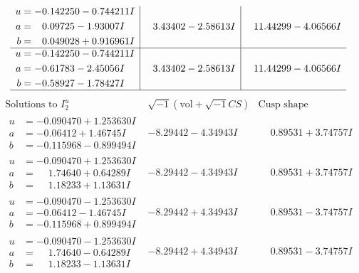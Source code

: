 \documentclass[1p]{elsarticle_modified}
\theoremstyle{definition}
\newcommand{\I}{\sqrt{-1}}
\begin{document}
$$\begin{array}{c|c|c}
\begin{aligned}
u &= -0.142250 - 0.744211 I \\
a &= \phantom{-}0.09725 - 1.93007 I \\
b &= \phantom{-}0.049028 + 0.916961 I\end{aligned}
 & \phantom{-}3.43402 - 2.58613 I & \phantom{-}11.44299 - 4.06566 I \\ \hline\begin{aligned}
u &= -0.142250 - 0.744211 I \\
a &= -0.61783 - 2.45056 I \\
b &= -0.58927 - 1.78427 I\end{aligned}
 & \phantom{-}3.43402 - 2.58613 I & \phantom{-}11.44299 - 4.06566 I\\
 \hline 
 \end{array}$$\newpage$$\begin{array}{c|c|c}  
\text{Solutions to }I^u_{2}& \I (\text{vol} + \sqrt{-1}CS) & \text{Cusp shape}\\
 \hline 
\begin{aligned}
u &= -0.090470 + 1.253630 I \\
a &= -0.06412 + 1.46745 I \\
b &= -0.115968 - 0.899494 I\end{aligned}
 & -8.29442 - 4.34943 I & \phantom{-}0.89531 + 3.74757 I \\ \hline\begin{aligned}
u &= -0.090470 + 1.253630 I \\
a &= \phantom{-}1.74640 + 0.64289 I \\
b &= \phantom{-}1.18233 + 1.13631 I\end{aligned}
 & -8.29442 - 4.34943 I & \phantom{-}0.89531 + 3.74757 I \\ \hline\begin{aligned}
u &= -0.090470 - 1.253630 I \\
a &= -0.06412 - 1.46745 I \\
b &= -0.115968 + 0.899494 I\end{aligned}
 & -8.29442 + 4.34943 I & \phantom{-}0.89531 - 3.74757 I \\ \hline\begin{aligned}
u &= -0.090470 - 1.253630 I \\
a &= \phantom{-}1.74640 - 0.64289 I \\
b &= \phantom{-}1.18233 - 1.13631 I\end{aligned}
 & -8.29442 + 4.34943 I & \phantom{-}0.89531 - 3.74757 I \\ \hline\begin{aligned}

\end{aligned}
\end{array}$$
\end{document}
